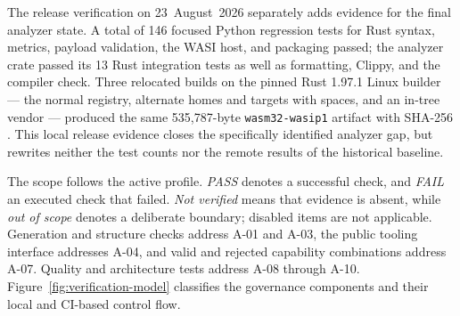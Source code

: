 The release verification on 23~August~2026 separately adds evidence for the
final analyzer state. A total of 146 focused Python regression tests for Rust
syntax, metrics, payload validation, the WASI host, and packaging passed; the
analyzer crate passed its 13 Rust integration tests as well as formatting,
Clippy, and the compiler check. Three relocated builds on the pinned Rust
1.97.1 Linux builder --- the normal registry, alternate homes and targets with
spaces, and an in-tree vendor --- produced the same 535,787-byte
\texttt{wasm32-wasip1} artifact with SHA-256
.
This local release evidence closes the specifically identified analyzer gap,
but rewrites neither the test counts nor the remote results of the historical
baseline.

The scope follows the active profile. \emph{PASS} denotes a successful check,
and \emph{FAIL} an executed check that failed. \emph{Not verified} means that
evidence is absent, while \emph{out of scope} denotes a deliberate boundary;
disabled items are not applicable. Generation and structure checks address
A-01 and A-03, the public tooling interface addresses A-04, and valid and
rejected capability combinations address A-07.
Quality and architecture tests address A-08 through A-10.
Figure~\ref{fig:verification-model} classifies the governance components and
their local and CI-based control flow.


